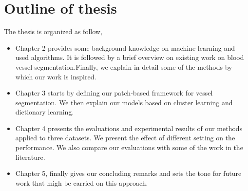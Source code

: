 \section{Outline of thesis}
The thesis is organized as follow,
\begin{itemize}
	\item Chapter 2 provides some background knowledge on machine learning and used algorithms. It is followed by a brief overview on existing work on blood vessel segmentation.Finally, we explain in detail some of the methods by which our work is inspired.
	\item Chapter 3 starts by defining our patch-based framework for vessel segmentation. We then explain our models based on cluster learning and dictionary learning.
	\item Chapter 4 presents the evaluations and experimental results of our methods applied to three datasets. We present the effect of different setting on the performance. We also compare our evaluations with some of the work in the literature.
	\item Chapter 5, finally gives our concluding remarks and sets the tone for future work that migh be carried on this approach. 
\end{itemize}